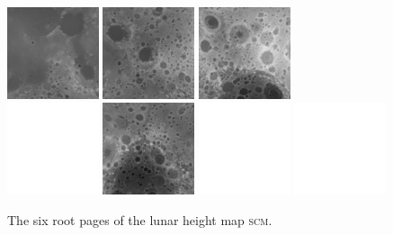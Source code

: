 \documentclass[oneside,10pt]{memoir}
\newcommand{\scm}     {\textsc{scm}}
\begin{document}
\begin{Spacing}{1.1}
\begin{figure}
  \includegraphics[width=0.24\textwidth]{fig/dtmh4.png}
  \includegraphics[width=0.24\textwidth]{fig/dtmh0.png}
  \includegraphics[width=0.24\textwidth]{fig/dtmh5.png}\\\vspace{1pt}
  \includegraphics[width=0.24\textwidth]{fig/blank.pdf}
  \includegraphics[width=0.24\textwidth]{fig/dtmh3.png}
  \includegraphics[width=0.24\textwidth]{fig/blank.pdf}
  \includegraphics[width=0.24\textwidth]{fig/blank.pdf}
  \caption{The six root pages of the lunar height map \scm.}
  \label{fig:dtmh}
\end{figure}


\end{Spacing}
\end{document}
